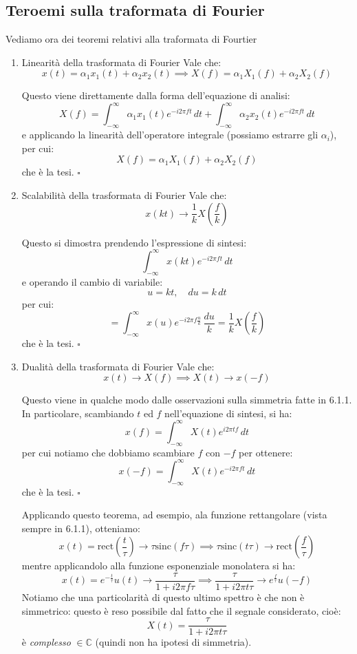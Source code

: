 \subsection{Teroemi sulla traformata di Fourier}
Vediamo ora dei teoremi relativi alla traformata di Fourtier
\begin{enumerate}
\item \begin{theorem}{Linearità della trasformata di Fourier}
Vale che:
$$
x(t) = \alpha_1 x_1(t) + \alpha_2 x_2(t) \implies X(f) = \alpha_1 X_1(f) + \alpha_2 X_2(f)
$$
\end{theorem}
Questo viene direttamente dalla forma dell'equazione di analisi:
$$
X(f) = \int_{-\infty}^{\infty} \alpha_1 x_1(t) e^{-i 2 \pi  f t} \, dt + \int_{-\infty}^{\infty} \alpha_2 x_2(t) e^{-i 2 \pi  f t} \, dt
$$
e applicando la linearità dell'operatore integrale (possiamo estrarre gli $\alpha_i$), per cui:
$$
X(f) = \alpha_1 X_1(f) + \alpha_2 X_2(f)
$$
che è la tesi. \hfill $\square$

\item \begin{theorem}{Scalabilità della trasformata di Fourier}
Vale che:
$$
x(kt) \rightarrow \frac{1}{k} X\left(\frac{f}{k}\right) 
$$
\end{theorem}
Questo si dimostra prendendo l'espressione di sintesi:
$$
\int_{-\infty}^{\infty} x(kt) e^{-i 2 \pi f t} \, dt
$$
e operando il cambio di variabile:
$$
u = kt, \quad du = k \, dt
$$
per cui:
$$
= \int_{-\infty}^{\infty} x(u) e^{-i 2 \pi f \frac{u}{k}} \, \frac{du}{k} = \frac{1}{k} X\left(\frac{f}{k}\right)
$$
che è la tesi. \hfill $\square$

\item \begin{theorem}{Dualità della trasformata di Fourier}
Vale che:
$$
x(t) \rightarrow X(f) \implies X(t) \rightarrow x(-f)
$$
\end{theorem}
Questo viene in qualche modo dalle osservazioni sulla simmetria fatte in 6.1.1. In particolare, scambiando $t$ ed $f$ nell'equazione di sintesi, si ha:
$$
x(f) = \int_{-\infty}^{\infty} X(t) e^{i 2 \pi t f} \, dt
$$
per cui notiamo che dobbiamo scambiare $f$ con $-f$ per ottenere:
$$
x(-f) = \int_{-\infty}^{\infty} X(t) e^{-i 2 \pi f t} \, dt
$$
che è la tesi. \hfill $\square$

Applicando questo teorema, ad esempio, ala funzione rettangolare (vista sempre in 6.1.1), otteniamo:
$$
x(t) = \mathrm{rect} \left( \frac{t}{\tau} \right) \rightarrow \tau \mathrm{sinc} (f \tau) \implies \tau \mathrm{sinc} (t \tau) \rightarrow \mathrm{rect} \left(\frac{f}{\tau}\right) 
$$
mentre applicandolo alla funzione esponenziale monolatera si ha:
$$
x(t) = e^{-\frac{t}{\tau}} u(t) \rightarrow \frac{\tau}{1 + i 2 \pi f \tau} \implies \frac{\tau}{1 + i 2 \pi t \tau} \rightarrow e^{\frac{f}{\tau}} u(-f)
$$
Notiamo che una particolarità di questo ultimo spettro è che non è simmetrico: questo è reso possibile dal fatto che il segnale considerato, cioè:
$$
X(t) = \frac{\tau}{1 + i 2 \pi t \tau}
$$
è \textit{complesso} $\in \mathbb{C}$ (quindi non ha ipotesi di simmetria).


\end{enumerate}
